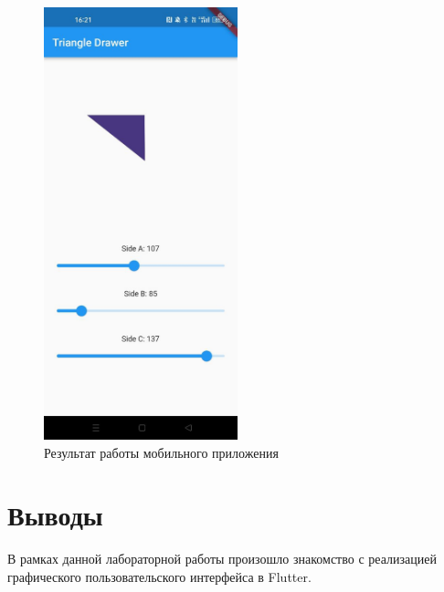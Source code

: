 \documentclass[a4paper, 14pt]{extarticle}
\begin{document}
\begin{figure}[H]
\centering
\includegraphics[width=0.5\textwidth]{images/res3.jpg}
\caption{Результат работы мобильного приложения}
\label{fig:img3}
\end{figure}


\section{Выводы}
В рамках данной лабораторной работы произошло знакомство с реализацией графического пользовательского интерфейса в Flutter.
\end{document}
